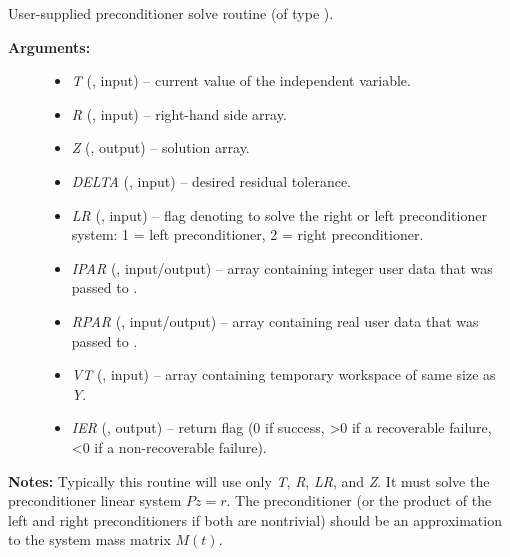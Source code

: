 \documentclass[letterpaper,10pt,english]{sphinxmanual}
\begin{document}

\begin{fulllineitems}
\label{f_interface/Usage:f/_/FARKMASSPSOL}
User-supplied preconditioner solve routine (of type
{\hyperref[c_interface/User_supplied:c.ARKSpilsMassPrecSolveFn]{\emph{}}}).
\begin{description}
\item[{\textbf{Arguments:}}] \leavevmode\begin{itemize}
\item {} 
\emph{T} (, input) -- current value of the independent
variable.

\item {} 
\emph{R} (, input) -- right-hand side array.

\item {} 
\emph{Z} (, output) -- solution array.

\item {} 
\emph{DELTA} (, input) -- desired residual tolerance.

\item {} 
\emph{LR} (, input) -- flag denoting to solve the right or
left preconditioner system: 1 = left preconditioner, 2 = right
preconditioner.

\item {} 
\emph{IPAR} (, input/output) -- array containing
integer user data that was passed to {\hyperref[f_interface/Usage:f/_/FARKMALLOC]{\emph{}}}.

\item {} 
\emph{RPAR} (, input/output) -- array containing real
user data that was passed to {\hyperref[f_interface/Usage:f/_/FARKMALLOC]{\emph{}}}.

\item {} 
\emph{VT} (, input) -- array containing temporary
workspace of same size as \emph{Y}.

\item {} 
\emph{IER}  (, output) -- return flag  (0 if success, \textgreater{}0 if
a recoverable failure, \textless{}0 if a non-recoverable failure).

\end{itemize}

\end{description}

\textbf{Notes:}
Typically this routine will use only \emph{T}, \emph{R}, \emph{LR}, and \emph{Z}.  It
must solve the preconditioner linear system \(Pz = r\).  The
preconditioner (or the product of the left and right
preconditioners if both are nontrivial) should be an approximation
to the system mass matrix \(M(t)\).

\end{fulllineitems}
\end{document}
